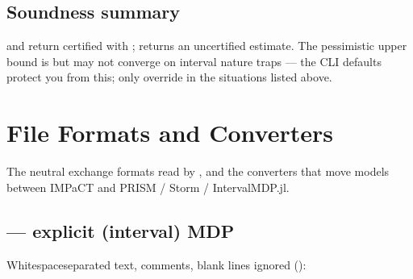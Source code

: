 \documentclass[a4paper,10pt,english]{sphinxmanual}
\begin{document}
\subsection{Soundness summary}
\label{\detokenize{manual/engines:soundness-summary}}
\sphinxAtStartPar
{} and  return certified  with
;  returns an uncertified estimate. The pessimistic
 upper bound is  but may not converge on interval nature traps —
the CLI defaults protect you from this; only override  in the situations
listed above.

\sphinxstepscope


\section{File Formats and Converters}
\label{\detokenize{manual/formats:file-formats-and-converters}}\label{\detokenize{manual/formats::doc}}
\sphinxAtStartPar
The neutral exchange formats read by , and the converters that move models
between IMPaCT and PRISM / Storm / IntervalMDP.jl.


\subsection{ — explicit (interval) MDP}
\label{\detokenize{manual/formats:imdp-explicit-interval-mdp}}
\sphinxAtStartPar
Whitespace\sphinxhyphen{}separated text, \sphinxcode{\sphinxupquote{\#}} comments, blank lines ignored ():
\end{document}
